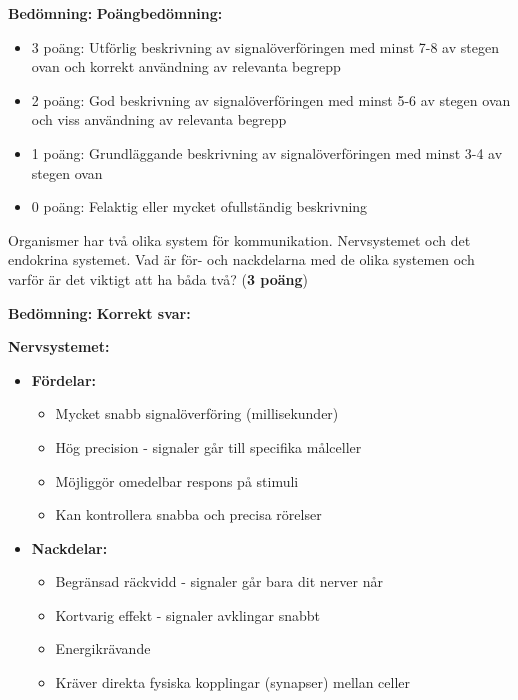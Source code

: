 \documentclass{exam}
\newenvironment{answer}
  {\begin{framed}\color{blue}\textbf{Bedömning:} }
  {\end{framed}}
\begin{document}
\begin{questions}
\begin{answer}
\textbf{Poängbedömning:}
\begin{itemize}
  \item 3 poäng: Utförlig beskrivning av signalöverföringen med minst 7-8 av stegen ovan och korrekt användning av relevanta begrepp
  \item 2 poäng: God beskrivning av signalöverföringen med minst 5-6 av stegen ovan och viss användning av relevanta begrepp
  \item 1 poäng: Grundläggande beskrivning av signalöverföringen med minst 3-4 av stegen ovan
  \item 0 poäng: Felaktig eller mycket ofullständig beskrivning
\end{itemize}
\end{answer}
\vspace{5mm}

\question
Organismer har två olika system för kommunikation. Nervsystemet och det endokrina systemet. Vad är för- och nackdelarna med de olika systemen och varför är det viktigt att ha båda två? (\textbf{3 poäng})

\vspace{10mm}

\begin{answer}
\textbf{Korrekt svar:}

\textbf{Nervsystemet:}
\begin{itemize}
  \item \textbf{Fördelar:}
  \begin{itemize}
    \item Mycket snabb signalöverföring (millisekunder)
    \item Hög precision - signaler går till specifika målceller
    \item Möjliggör omedelbar respons på stimuli
    \item Kan kontrollera snabba och precisa rörelser
  \end{itemize}
  
  \item \textbf{Nackdelar:}
  \begin{itemize}
    \item Begränsad räckvidd - signaler går bara dit nerver når
    \item Kortvarig effekt - signaler avklingar snabbt
    \item Energikrävande
    \item Kräver direkta fysiska kopplingar (synapser) mellan celler
  \end{itemize}
\end{itemize}


\end{answer}
\end{questions}
\end{document}
